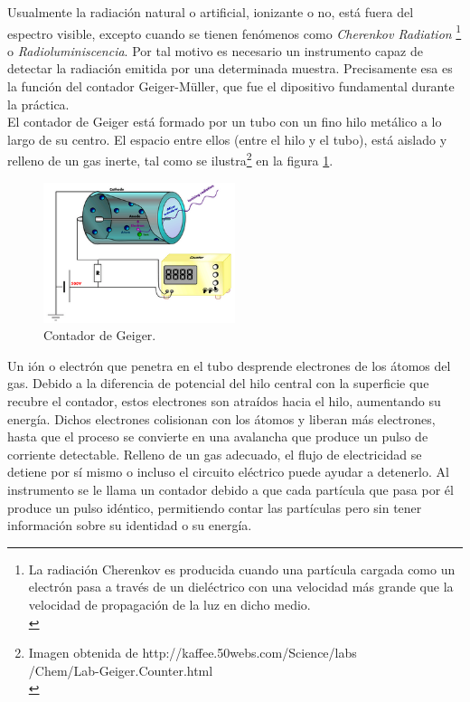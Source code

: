\documentclass[prb,aps,twocolumn,preprintnumbers,amsmath,amssymb]{revtex4}
\begin{document}
Usualmente la radiación natural o artificial, ionizante o no, está fuera del espectro visible, excepto cuando se tienen fenómenos como \textit{Cherenkov Radiation} \footnote{La radiación Cherenkov es producida cuando una partícula cargada como un electrón pasa a través de un dieléctrico con una velocidad más grande que la velocidad de propagación de la luz en dicho medio.\\} o \textit{Radioluminiscencia}. Por tal motivo es necesario un instrumento capaz de detectar la radiación emitida por una determinada muestra. Precisamente esa es la función del contador Geiger-Müller, que fue el dipositivo fundamental durante la práctica.\\

El contador de Geiger está formado por un tubo con un fino hilo metálico a lo largo de su centro. El espacio entre ellos (entre el hilo y el tubo), está aislado y relleno de un gas inerte, tal como se ilustra\footnote{Imagen  obtenida de http://kaffee.50webs.com/Science/labs\\/Chem/Lab-Geiger.Counter.html\\} en la figura \ref{fig: contador}.\\

\begin{figure}[h!]
	\centering
	\includegraphics[width=0.5\textwidth]{geiger}
	\caption{ Contador de Geiger. }
	\label{fig: contador}
\end{figure}

Un ión o electrón que penetra en el tubo desprende electrones de los átomos del gas. Debido a la diferencia de potencial del hilo central con la superficie que recubre el contador, estos electrones son atraídos hacia el hilo, aumentando su energía. Dichos electrones colisionan con los átomos y liberan más electrones, hasta que el proceso se convierte en una avalancha que produce un pulso de corriente detectable. Relleno de un gas adecuado, el flujo de electricidad se detiene por sí mismo o incluso el circuito eléctrico puede ayudar a detenerlo.
Al instrumento se le llama un contador debido a que cada partícula que pasa por él produce un pulso idéntico, permitiendo contar las partículas pero sin tener información sobre su identidad o su energía.
\end{document}
